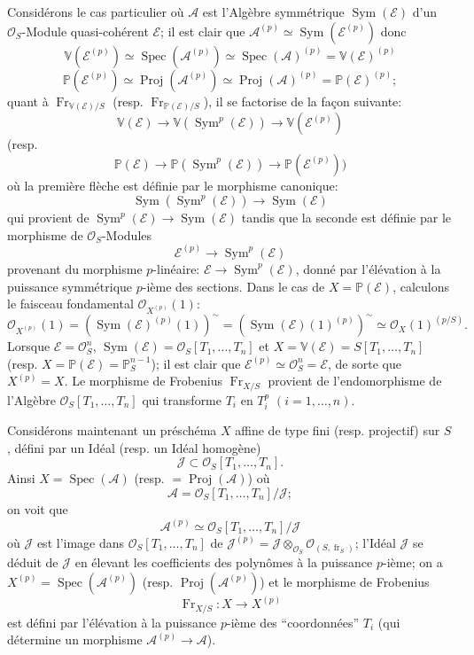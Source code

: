 \documentclass[11pt]{article}
\DeclareMathOperator{\Spec}{Spec}
\providecommand{\OO}{\mathcal{O}}
\providecommand{\cE}{\mathcal E}
\providecommand{\Spec}{\operatorname{Spec}}
\providecommand{\Sym}{\operatorname{Sym}}
\providecommand{\Spec}{\operatorname{Spec}}
\providecommand{\Spec}{\operatorname{Spec}}
\providecommand{\fr}{\operatorname{fr}}
\providecommand{\Fr}{\operatorname{Fr}}
\providecommand{\Proj}{\operatorname{Proj}}
\providecommand{\Sym}{\operatorname{Sym}}
\providecommand{\JJ}{\mathcal J}
\providecommand{\Fr}{\operatorname{Fr}}
\providecommand{\fr}{\operatorname{fr}}
\providecommand{\Spec}{\operatorname{Spec}}
\begin{document}
Considérons le cas particulier où $\mathcal{A}$ est l'Algèbre symmétrique $\Sym(\cE)$ d'un $\OO_S$-Module quasi-cohérent $\cE$; il est clair que $\mathcal{A}^{(p)}\simeq\Sym(\cE^{(p)})$ donc
\[
\mathbb V(\cE^{(p)})\simeq\Spec(\mathcal{A}^{(p)})\simeq\Spec(\mathcal{A})^{(p)}=\mathbb V(\cE)^{(p)}
\]
\[
\mathbb P(\cE^{(p)})\simeq\Proj(\mathcal{A}^{(p)})\simeq\Proj(\mathcal{A})^{(p)}=\mathbb P(\cE)^{(p)};
\]
quant à $\Fr_{\mathbb V(\cE)/S}$ (resp. $\Fr_{\mathbb P(\cE)/S}$), il se factorise de la façon suivante:
\[
\mathbb V(\cE)\longrightarrow \mathbb V(\Sym^p(\cE))\longrightarrow \mathbb V(\cE^{(p)})
\]
(resp.
\[
\mathbb P(\cE)\longrightarrow \mathbb P(\Sym^p(\cE))\longrightarrow \mathbb P(\cE^{(p)}))
\]
où la
première flèche est définie par le morphisme canonique:
\[
\Sym(\Sym^p(\cE))\longrightarrow \Sym(\cE)
\]
qui provient de $\Sym^p(\cE)\to\Sym(\cE)$ tandis que la seconde est définie par le morphisme de $\OO_S$-Modules
\[
\cE^{(p)}\longrightarrow \Sym^p(\cE)
\]
provenant du morphisme $p$-linéaire: $\cE\to\Sym^p(\cE)$, donné par l'élévation à la puissance symmétrique $p$-ième des sections. Dans le cas de $X=\mathbb P(\cE)$, calculons le faisceau fondamental $\OO_{X^{(p)}}(1)$:
\[
\OO_{X^{(p)}}(1)=(\Sym(\cE)^{(p)}(1))^{\sim}
=(\Sym(\cE)(1)^{(p)})^{\sim}
\simeq \OO_X(1)^{(p/S)}.
\]
Lorsque $\cE=\OO_S^n$, $\Sym(\cE)=\OO_S[T_1,\ldots,T_n]$ et $X=\mathbb V(\cE)=S[T_1,\ldots,T_n]$ (resp. $X=\mathbb P(\cE)=\mathbb P_S^{n-1}$); il est clair que $\cE^{(p)}\simeq\OO_S^n=\cE$, de sorte que $X^{(p)}=X$. Le morphisme de Frobenius $\Fr_{X/S}$ provient de l'endomorphisme de l'Algèbre $\OO_S[T_1,\ldots,T_n]$ qui transforme $T_i$ en $T_i^p$ $(i=1,\ldots,n)$.

Considérons maintenant un préschéma $X$ affine de type fini (resp. projectif) sur $S$, défini par un Idéal (resp. un Idéal homogène)
\[
\JJ\subset \OO_S[T_1,\ldots,T_n].
\]
Ainsi $X=\Spec(\mathcal{A})$ (resp. $=\Proj(\mathcal{A})$) où
\[
\mathcal{A}=\OO_S[T_1,\ldots,T_n]/\JJ;
\]
on voit que
\[
\mathcal{A}^{(p)}\simeq \OO_S[T_1,\ldots,T_n]/\mathscr{J}
\]
où $\mathscr{J}$ est l'image dans $\OO_S[T_1,\ldots,T_n]$ de $\JJ^{(p)}=\JJ\otimes_{\OO_S}\OO_{(S,\fr_S)}$; l'Idéal $\mathscr{J}$ se déduit de $\JJ$ en élevant les coefficients des polynômes à la puissance $p$-ième; on a $X^{(p)}=\Spec(\mathcal{A}^{(p)})$ (resp. $\Proj(\mathcal{A}^{(p)})$) et le
morphisme de Frobenius
\[
\Fr_{X/S}:X\longrightarrow X^{(p)}
\]
est défini par l'élévation à la puissance $p$-ième des ``coordonnées'' $T_i$ (qui détermine un morphisme $\mathcal{A}^{(p)}\to\mathcal{A}$).
\end{document}
